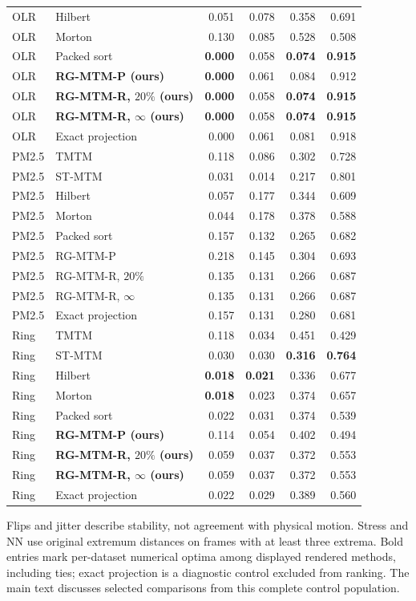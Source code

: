\begin{longtable}{llrrrr}
OLR & Hilbert & 0.051 & 0.078 & 0.358 & 0.691\\
OLR & Morton & 0.130 & 0.085 & 0.528 & 0.508\\
OLR & Packed sort & \textbf{0.000} & 0.058 & \textbf{0.074} & \textbf{0.915}\\
OLR & \textbf{RG-MTM-P (ours)} & \textbf{0.000} & 0.061 & 0.084 & 0.912\\
OLR & \textbf{RG-MTM-R, $20\%$ (ours)} & \textbf{0.000} & 0.058 & \textbf{0.074} & \textbf{0.915}\\
OLR & \textbf{RG-MTM-R, $\infty$ (ours)} & \textbf{0.000} & 0.058 & \textbf{0.074} & \textbf{0.915}\\
OLR & Exact projection & 0.000 & 0.061 & 0.081 & 0.918\\
PM2.5 & TMTM & 0.118 & 0.086 & 0.302 & 0.728\\
PM2.5 & ST-MTM & 0.031 & 0.014 & 0.217 & 0.801\\
PM2.5 & Hilbert & 0.057 & 0.177 & 0.344 & 0.609\\
PM2.5 & Morton & 0.044 & 0.178 & 0.378 & 0.588\\
PM2.5 & Packed sort & 0.157 & 0.132 & 0.265 & 0.682\\
PM2.5 & RG-MTM-P & 0.218 & 0.145 & 0.304 & 0.693\\
PM2.5 & RG-MTM-R, $20\%$ & 0.135 & 0.131 & 0.266 & 0.687\\
PM2.5 & RG-MTM-R, $\infty$ & 0.135 & 0.131 & 0.266 & 0.687\\
PM2.5 & Exact projection & 0.157 & 0.131 & 0.280 & 0.681\\
Ring & TMTM & 0.118 & 0.034 & 0.451 & 0.429\\
Ring & ST-MTM & 0.030 & 0.030 & \textbf{0.316} & \textbf{0.764}\\
Ring & Hilbert & \textbf{0.018} & \textbf{0.021} & 0.336 & 0.677\\
Ring & Morton & \textbf{0.018} & 0.023 & 0.374 & 0.657\\
Ring & Packed sort & 0.022 & 0.031 & 0.374 & 0.539\\
Ring & \textbf{RG-MTM-P (ours)} & 0.114 & 0.054 & 0.402 & 0.494\\
Ring & \textbf{RG-MTM-R, $20\%$ (ours)} & 0.059 & 0.037 & 0.372 & 0.553\\
Ring & \textbf{RG-MTM-R, $\infty$ (ours)} & 0.059 & 0.037 & 0.372 & 0.553\\
Ring & Exact projection & 0.022 & 0.029 & 0.389 & 0.560\\
\end{longtable}
\noindent Flips and jitter describe stability, not agreement with physical motion. Stress and NN use original extremum distances on frames with at least three extrema. Bold entries mark per-dataset numerical optima among displayed rendered methods, including ties; exact projection is a diagnostic control excluded from ranking. The main text discusses selected comparisons from this complete control population.\endgroup
